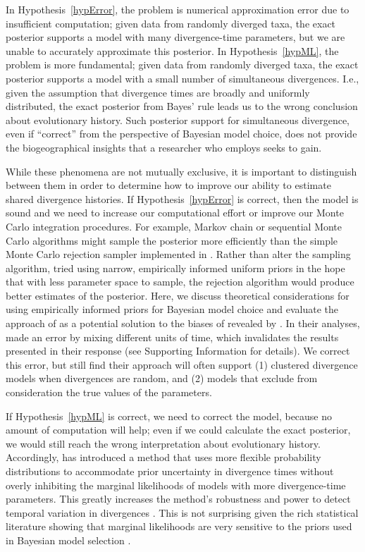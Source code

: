 In Hypothesis~\ref{hypError}, the problem is numerical approximation error due to
insufficient computation;
given data from randomly diverged taxa, the exact posterior supports a model
with many divergence-time parameters, but we are unable to accurately
approximate this posterior.
In Hypothesis~\ref{hypML}, the problem is more fundamental; given data from
randomly diverged taxa, the exact posterior supports a model with a small
number of simultaneous divergences.
I.e., given the assumption that divergence times are broadly and uniformly
distributed, the exact posterior from Bayes' rule leads us to the wrong
conclusion about evolutionary history.
Such posterior support for simultaneous divergence, even if ``correct'' from
the perspective of Bayesian model choice, does not provide the biogeographical
insights that a researcher who employs \msb seeks to gain.

While these phenomena are not mutually exclusive, it is important to
distinguish between them in order to determine how to improve our ability to
estimate shared divergence histories.
If Hypothesis~\ref{hypError} is correct, then the model is sound and we need to
increase our computational effort or improve our Monte Carlo integration
procedures.
For example, Markov chain or sequential Monte Carlo algorithms might sample the
posterior more efficiently than the simple Monte Carlo rejection sampler
implemented in \msb.
Rather than alter the sampling algorithm, \citet{Hickerson2013} tried using
narrow, empirically informed uniform priors in the hope that with less
parameter space to sample, the rejection algorithm would produce better
estimates of the posterior.
Here, we discuss theoretical considerations for using empirically informed
priors for Bayesian model choice and evaluate the approach of
\citet{Hickerson2013} as a potential solution to the biases of \msb revealed by
\citet{Oaks2012}.
In their analyses, \citet{Hickerson2013} made an error by mixing different
units of time, which invalidates the results presented in their response (see
Supporting Information for details).
We correct this error, but still find their approach will often support
(1) clustered divergence models when divergences are random, and
(2) models that exclude from consideration the true values of the
parameters.

If Hypothesis~\ref{hypML} is correct, we need to correct the model, because no
amount of computation will help; even if we could calculate the exact
posterior, we would still reach the wrong interpretation about evolutionary
history.
Accordingly, \citet{Oaks2014dpp} has introduced a method that uses more
flexible probability distributions to accommodate prior uncertainty in
divergence times without overly inhibiting the marginal likelihoods of models
with more divergence-time parameters.
This greatly increases the method's robustness and power to detect temporal
variation in divergences \citep{Oaks2014dpp}.
This is not surprising given the rich statistical literature showing that
marginal likelihoods are very sensitive to the priors used in Bayesian model
selection
\citep[e.g.,][]{Jeffreys1939,Lindley1957}.

